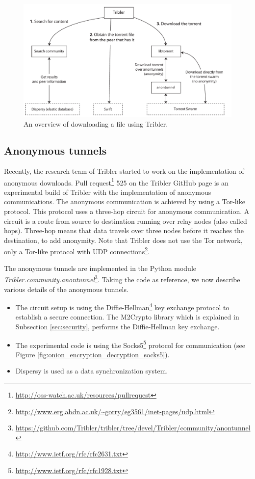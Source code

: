 		\begin{figure}[!htb]
			\centering
			\includegraphics[width=\textwidth]{graphics/tribler-overview.pdf}
			\caption{An overview of downloading a file using Tribler.}
			\label{fig:tribleroverview}
		\end{figure}
	
	\subsection{Anonymous tunnels}
		\label{sec:anonymoustunnels}
			Recently, the research team of Tribler started to work on the implementation of anonymous downloads. Pull request\footnote{\url{http://oss-watch.ac.uk/resources/pullrequest}} 525 on the Tribler GitHub page \cite{pullrequest525} is an experimental build of Tribler with the implementation of anonymous communications. The anonymous communication is achieved by using a Tor-like protocol. This protocol uses a three-hop circuit for anonymous communication. A circuit is a route from source to destination running over relay nodes (also called hops). Three-hop means that data travels over three nodes before it reaches the destination, to add anonymity. Note that Tribler does not use the Tor network, only a Tor-like protocol with UDP connections\footnote{\url{http://www.erg.abdn.ac.uk/~gorry/eg3561/inet-pages/udp.html}}.
			
			The anonymous tunnels are implemented in the Python module \emph{Tribler.community.anontunnel}\footnote{\url{https://github.com/Tribler/tribler/tree/devel/Tribler/community/anontunnel}}. Taking the code as reference, we now describe various details of the anonymous tunnels.
			
			\begin{itemize} 
				\item The circuit setup is using the Diffie-Hellman\footnote{\url{http://www.ietf.org/rfc/rfc2631.txt}} key exchange protocol to establish a secure connection. The M2Crypto library which is explained in Subsection \ref{sec:security}, performs the Diffie-Hellman key exchange.
				\item The experimental code is using the Socks5\footnote{\url{http://www.ietf.org/rfc/rfc1928.txt}} protocol for communication (see Figure \ref{fig:onion_encryption_decryption_socks5}).
				\item Dispersy is used as a data synchronization system. 
			\end{itemize}
			
